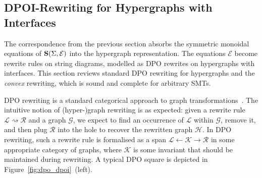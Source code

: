 \subsection{DPOI-Rewriting for Hypergraphs with Interfaces}
The correspondence from the previous section absorbs the symmetric monoidal equations of $\mathbf{S}(\Sigma, \mathcal{E})$ into the hypergraph representation. 
The equations $\mathcal{E}$ become rewrite rules on string diagrams, modelled as DPO rewrites on hypergraphs with interfaces.
This section reviews standard DPO rewriting for hypergraphs and the \textit{convex} rewriting, which is sound and complete for arbitrary SMTs.

DPO rewriting is a standard categorical approach to graph transformations~\cite{dpo}.
The intuitive notion of (hyper-)graph rewriting is  as expected: given a rewrite rule $\mathcal L \rightsquigarrow \mathcal R$ and a graph $\mathcal{G}$,  we expect to find an occurrence of $\mathcal L$ within $\mathcal{G}$,  remove it,  and then plug $\mathcal R$ into the hole to recover the rewritten graph $\mathcal{H}$.  In DPO rewriting,  such a rewrite rule is formalised as a span $\mathcal L \xleftarrow{} \mathcal K \xrightarrow{} \mathcal R$ in some appropriate category of graphs,  where $\mathcal K$ is some invariant that should be maintained during rewriting.
A typical DPO square is depicted in Figure~\ref{fig:dpo_dpoi}~(left).


